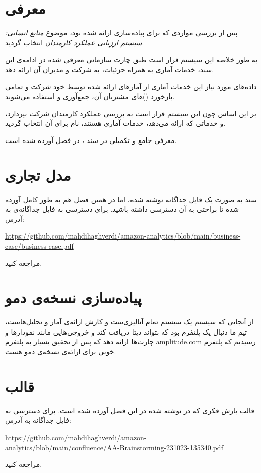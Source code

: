 \documentclass[11pt, oneside]{book}
\newcommand{\amz}{\lr{Amazon} }
\begin{document}
\frontmatter

\tableofcontents
\mainmatter

\chapter{معرفی}
    پس از بررسی مواردی که برای پیاده‌سازی ارائه شده بود، موضوع \textit{منابع انسانی:‌ سیستم ارزیابی عملکرد کارمندان} انتخاب گردید.
    
    به طور خلاصه این سیستم قرار است طبق چارت سازمانی معرفی شده در ادامه‌ی این سند، خدمات آماری به همراه جزئیات، به شرکت \amz و مدیران آن ارائه دهد. 
    
    داده‌های مورد نیاز این خدمات آماری از آمار‌های ارائه شده توسط خود شرکت \amz و تمامی بازخورد ()های مشتریان آن، جمع‌آوری و استفاده می‌شوند.
    
    بر این اساس چون این سیستم قرار است به بررسی عملکرد کارمندان شرکت \amz بپردازد، و خدماتی که ارائه می‌دهد، خدمات آماری هستند، نام  برای آن انتخاب گردید.
    
    معرفی جامع و تکمیلی در سند ، در فصل  آورده شده است.
    
\chapter{مدل تجاری }\label{business-case}
سند  به صورت یک فایل  جداگانه نوشته شده، اما در همین فصل هم به طور کامل آورده شده تا براحتی به آن دسترسی داشته باشید. برای دسترسی به فایل جداگانه‌ی  به آدرس:
\begin{flushleft}
    \url{https://github.com/mahdihaghverdi/amazon-analytics/blob/main/business-case/business-case.pdf}
\end{flushleft}
مراجعه کنید.



\chapter{پیاده‌سازی نسخه‌ی دمو}
از آنجایی که سیستم 
یک سیستم تمام آنالیزی‌ست و کارش ارائه‌ی آمار و تحلیل‌هاست، تیم ما دنبال یک پلتفرم بود که بتواند دیتا دریافت کند و خروجی‌هایی مانند نمودارها و چارت‌ها ارائه دهد که پس از تحقیق بسیار به پلتفرم
\url{amplitude.com}
رسیدیم که پلتفرم خوبی برای ارائه‌ی نسخه‌ی دمو هست.

\chapter{قالب }
قالب بارش فکری که در  نوشته شده در این فصل آورده شده است. برای دسترسی به فایل جداگانه به آدرس:
\begin{flushleft}
    \url{https://github.com/mahdihaghverdi/amazon-analytics/blob/main/confluence/AA-Brainstorming-231023-135340.pdf}
\end{flushleft}
مراجعه کنید.


\end{document}
